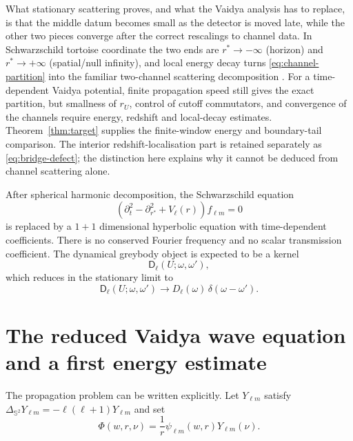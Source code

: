 \documentclass[11pt,a4paper]{article}
\theoremstyle{definition}
\theoremstyle{remark}
\begin{document}
	What stationary scattering proves, and what the Vaidya analysis has to replace,
	is that the middle datum becomes small as the detector is moved late, while
	the other two pieces converge after the correct rescalings to channel data.
	In Schwarzschild tortoise coordinate the two ends are
	$r^*\to-\infty$ (horizon) and $r^*\to+\infty$ (spatial/null infinity), and
	local energy decay turns \eqref{eq:channel-partition} into the familiar
	two-channel scattering decomposition
	\cite{DimockKay1987,DafermosRodnianski2013,Nicolas2016}.  For a time-dependent Vaidya
	potential, finite propagation speed still gives the exact partition, but
	smallness of $r_U$, control of cutoff commutators, and convergence of the
	channels require energy, redshift and local-decay estimates.
	Theorem~\ref{thm:target} supplies the finite-window energy and boundary-tail
	comparison.  The interior redshift-localisation part is retained separately
	as \eqref{eq:bridge-defect}; the distinction here explains why it cannot be
	deduced from channel scattering alone.
	
	After spherical harmonic decomposition, the Schwarzschild equation
	\begin{equation}
		\left(\partial_t^2-\partial_{r^*}^2+V_\ell(r)\right)f_{\ell m}=0
	\end{equation}
	is replaced by a $1+1$ dimensional hyperbolic equation with time-dependent
	coefficients.  There is no conserved Fourier frequency and no scalar
	transmission coefficient.  The dynamical greybody object is expected to be a
	kernel
	\begin{equation}
		\mathsf D_\ell(U;\omega,\omega'),
	\end{equation}
	which reduces in the stationary limit to
	\begin{equation}
		\mathsf D_\ell(U;\omega,\omega')
		\longrightarrow
		D_\ell(\omega)\,\delta(\omega-\omega').
	\end{equation}
	
	\section{The reduced Vaidya wave equation and a first energy estimate}
	\label{sec:wave-equation}
	
	The propagation problem can be written explicitly.  Let
	$Y_{\ell m}$ satisfy
	$\Delta_{\mathbb S^2}Y_{\ell m}=-\ell(\ell+1)Y_{\ell m}$ and set
	\begin{equation}
		\Phi(w,r,\nu)=\frac{1}{r}\psi_{\ell m}(w,r)Y_{\ell m}(\nu).
	\end{equation}
	
\end{document}
